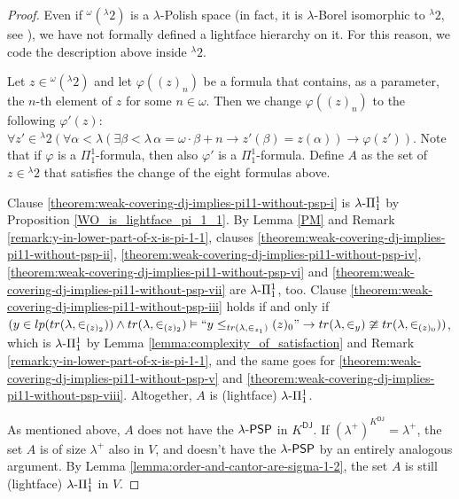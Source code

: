 \documentclass{amsart}
\numberwithin{equation}{section}
\def\hyp{{\hbox{-}}}
\theoremstyle{definition}
\theoremstyle{remark}
\begin{document}
\begin{proof}
    Even if ${}^{\omega}({}^{\lambda}2)$ is a $\lambda$-Polish space (in fact, it is $\lambda$-Borel isomorphic to ${}^{\lambda}2$, see \cite[Theorem 5.3.10]{DMR}), we have not formally defined a lightface hierarchy on it. For this reason, we code the description above inside ${}^\lambda 2$.

    Let $z\in{}^{\omega}({}^{\lambda}2)$ and let $\varphi((z)_n)$ be a formula that contains, as a parameter, the $n$-th element of $z$ for some $n\in\omega$. Then we change $\varphi((z)_n)$ to the following $\varphi'(z)$: $\forall z'\in{}^\lambda 2 (\forall\alpha<\lambda (\exists\beta<\lambda\, \alpha=\omega\cdot\beta+n \rightarrow z'(\beta)=z(\alpha)) \rightarrow \varphi(z'))$. Note that if $\varphi$ is a $\Pi^1_1$-formula, then also $\varphi'$ is a $\Pi^1_1$-formula. Define $A$ as the set of $z\in {}^\lambda 2$ that satisfies the change of the eight formulas above.
    
    Clause \eqref{theorem:weak-covering-dj-implies-pi11-without-psp-i} is $\lambda\hyp\Pi^1_1$ by Proposition \ref{WO_is_lightface_pi_1_1}. By Lemma \ref{PM} and Remark \ref{remark:y-in-lower-part-of-x-is-pi-1-1}, clauses \eqref{theorem:weak-covering-dj-implies-pi11-without-psp-ii}, \eqref{theorem:weak-covering-dj-implies-pi11-without-psp-iv}, \eqref{theorem:weak-covering-dj-implies-pi11-without-psp-vi} and \eqref{theorem:weak-covering-dj-implies-pi11-without-psp-vii} are $\lambda\hyp\Pi^1_1$, too. Clause \eqref{theorem:weak-covering-dj-implies-pi11-without-psp-iii} holds if and only if $(y\in lp(tr(\lambda,\in_{(z)_{2}}))\wedge tr(\lambda,\in_{(z)_{2}})\vDash``y\leq_{tr(\lambda,\in_{z_{1}})}(z)_{0}"\rightarrow tr(\lambda,\in_y)\ncong tr(\lambda,\in_{(z)_0}))$, which is $\lambda\hyp\Pi^1_1$ by Lemma \ref{lemma:complexity_of_satisfaction} and Remark \ref{remark:y-in-lower-part-of-x-is-pi-1-1}, and the same goes for \eqref{theorem:weak-covering-dj-implies-pi11-without-psp-v} and \eqref{theorem:weak-covering-dj-implies-pi11-without-psp-viii}. Altogether, $A$ is (lightface) $\lambda\hyp\Pi^1_1$.

    As mentioned above, $A$ does not have the $\lambda\hyp\mathsf{PSP}$ in $K^{\mathsf{DJ}}$.
    If $(\lambda^{+})^{K^{\mathsf{DJ}}}=\lambda^{+}$, the set $A$ is of size $\lambda^{+}$ also in $V$, and doesn't have the $\lambda\hyp\mathsf{PSP}$ by an entirely analogous argument. By Lemma \ref{lemma:order-and-cantor-are-sigma-1-2}, the set $A$ is still (lightface) $\lambda\hyp\Pi^1_1$ in $V$.
\end{proof}	

\end{document}
